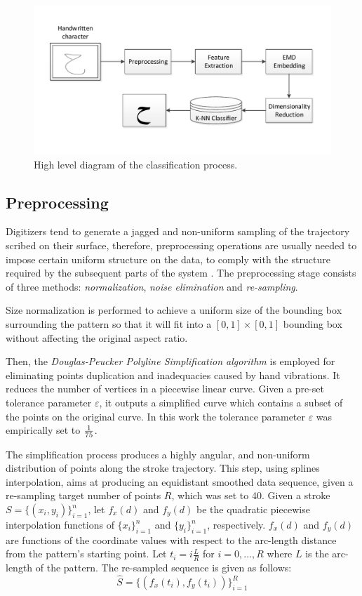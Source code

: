 \documentclass[10pt, conference, compsocconf]{IEEEtran}
\begin{document}
\begin{figure}
\centering
\includegraphics[width=1\columnwidth]{./figures/letters_classifier_learning_flow2}       
\caption{High level diagram of the classification process.}
\label{fig:letters_classifier_learning_flow}
\end{figure}
 
\subsection{Preprocessing}
Digitizers tend to generate a jagged and non-uniform sampling of the trajectory scribed on their surface, therefore, preprocessing operations are usually needed to impose certain uniform structure on the data, to comply with the structure required by the subsequent parts of the system \cite{al2011online}. 
The preprocessing stage consists of three methods: \emph{normalization}, \emph{noise elimination} and \emph{re-sampling}.

Size normalization is performed to achieve a uniform size of the bounding box surrounding the pattern so that it will fit into a $[0,1]\times[0,1]$ bounding box without affecting the original aspect ratio. 

Then, the \emph{Douglas-Peucker Polyline Simplification algorithm} \cite{douglas1973algorithms} is employed for eliminating points duplication and inadequacies caused by hand vibrations. 
It reduces the number of vertices in a piecewise linear curve.
Given a pre-set tolerance parameter $\varepsilon$, it outputs a simplified curve which contains a subset of the points on the original curve.
In this work the tolerance parameter $\varepsilon$ was empirically set to ${1 \over 75}$.

The simplification process produces a highly angular, and non-uniform distribution of points along the stroke trajectory.
This step, using splines interpolation, aims at producing an equidistant smoothed data sequence, given a re-sampling target number of points $R$, which was set to 40. 
Given a stroke $S=\{(x_i,y_i)\}_{i=1}^{n}$, let $f_{x}(d)$ and $f_{y}(d)$ be the quadratic piecewise interpolation functions of $\{x_i\}_{i=1}^{n}$ and $\{y_i\}_{i=1}^{n}$, respectively. 
$f_{x}(d)$ and $f_{y}(d)$ are functions of the coordinate values with respect to the arc-length distance from the pattern's starting point. 
Let $t_i=i\frac{L}{R}$ for $i=0,...,R$ where $L$ is the arc-length of the pattern.
The re-sampled sequence is given as follows:
\begin{equation}
\widehat{S}=\{(f_x(t_i),f_y(t_i))\}_{i=1}^{R}
\end{equation}
\end{document}
